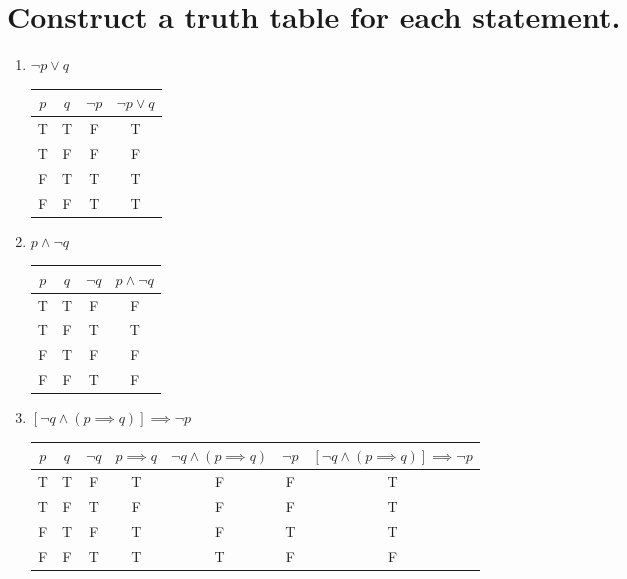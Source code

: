 \documentclass[11pt]{article} %
\begin{document}
\section{Construct a truth table for each statement.}
\begin{enumerate}
	\item $\neg p \lor q$
	\begin{center}
	\begin{tabular}{|c|c|c|c|}
	\hline
	$p$ & $q$ & $\neg p$ & $\neg p \lor q$\\
	\hline
	T & T & F & T\\
	T & F & F & F\\
	F & T & T & T\\
	F & F & T & T\\
	\hline
	\end{tabular}
	\end{center}
	\item $p \land \neg q$
	\begin{center}
	\begin{tabular}{|c|c|c|c|}
	\hline
	$p$ & $q$ & $\neg q$ & $p \land \neg q$\\
	\hline
	T & T & F & F\\
	T & F & T & T\\
	F & T & F & F\\
	F & F & T & F\\
	\hline
	\end{tabular}
	\end{center}
	\item $[\neg q \land (p \implies q)] \implies \neg p$
	\begin{center}
	\begin{tabular}{|c|c|c|c|c|c|c|}
	\hline
	$p$ & $q$ & $\neg q$ & $p \implies q$ & $\neg q \land (p \implies q)$ & $\neg p$ & $[\neg q \land (p \implies q)] \implies \neg p$\\
	\hline
	T & T & F & T & F & F & T\\
	T & F & T & F & F & F & T\\
	F & T & F & T & F & T & T\\
	F & F & T & T & T & F & F\\
	\hline
	\end{tabular}
	\end{center}
\end{enumerate}
\end{document}
